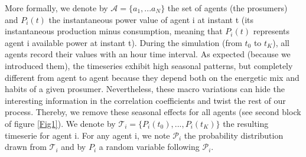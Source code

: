 \documentclass[conference]{IEEEtran}
\begin{document}



More formally, we denote by $ \mathcal{A} = \{ a_{1},...a_{N} \} $ the set of agents (the prosumers) and $ P_{i}(t) $ the instantaneous power value of agent i at instant t (its instantaneous production minus consumption, meaning that $ P_{i}(t) $ represents agent i available power at instant t). During the simulation (from $t_{0} $ to $ t_{K} $), all agents record their values with an hour time interval. As expected (because we introduced them), the timeseries exhibit high seasonal patterns, but completely different from agent to agent because they depend both on the energetic mix and habits of a given prosumer. Nevertheless, these macro variations can hide the interesting information in the correlation coefficients and twist the rest of our process. Thereby, we remove these seasonal effects for all agents (see second block of figure \ref{Fig1}). We denote by $ \mathcal{T}_{i} = \{ P_{i}(t_{0}),...,P_{i}(t_{K}) \} $ the resulting timeserie for  agent i. For any agent i, we note $ \mathcal{P}_{i} $ the probability distribution drawn from $ \mathcal{T}_{i} $ and by $ P_{i} $ a random variable following $ \mathcal{P}_{i} $.
\end{document}
